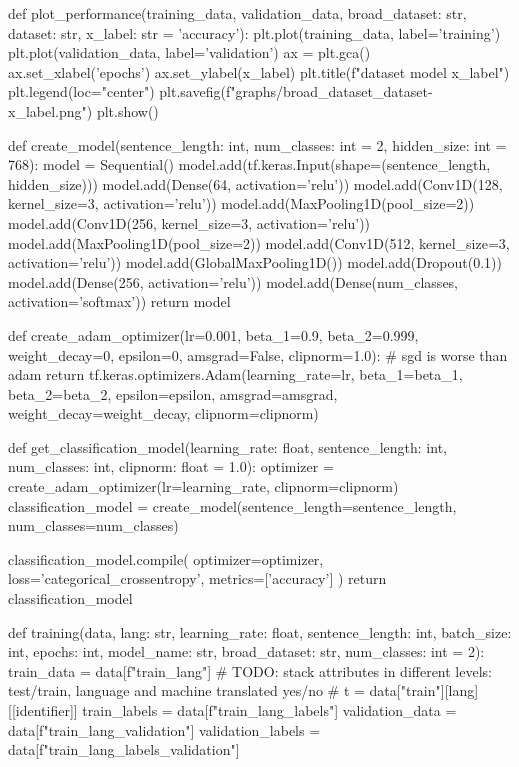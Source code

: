 \begin{python}
def plot_performance(training_data, validation_data, broad_dataset: str, dataset: str, x_label: str = 'accuracy'):
    plt.plot(training_data, label='training')
    plt.plot(validation_data, label='validation')
    ax = plt.gca()
    ax.set_xlabel('epochs')
    ax.set_ylabel(x_label)
    plt.title(f"{dataset} model {x_label}")
    plt.legend(loc="center")
    plt.savefig(f"graphs/{broad_dataset}_{dataset}-{x_label}.png")
    plt.show()


def create_model(sentence_length: int, num_classes: int = 2, hidden_size: int = 768):
    model = Sequential()
    model.add(tf.keras.Input(shape=(sentence_length, hidden_size)))
    model.add(Dense(64, activation='relu'))
    model.add(Conv1D(128, kernel_size=3, activation='relu'))
    model.add(MaxPooling1D(pool_size=2))
    model.add(Conv1D(256, kernel_size=3, activation='relu'))
    model.add(MaxPooling1D(pool_size=2))
    model.add(Conv1D(512, kernel_size=3, activation='relu'))
    model.add(GlobalMaxPooling1D())
    model.add(Dropout(0.1))
    model.add(Dense(256, activation='relu'))
    model.add(Dense(num_classes, activation='softmax'))
    return model


def create_adam_optimizer(lr=0.001, beta_1=0.9, beta_2=0.999, weight_decay=0, epsilon=0, amsgrad=False, clipnorm=1.0):
    # sgd is worse than adam
    return tf.keras.optimizers.Adam(learning_rate=lr, beta_1=beta_1, beta_2=beta_2, epsilon=epsilon, amsgrad=amsgrad,
                                    weight_decay=weight_decay, clipnorm=clipnorm)


def get_classification_model(learning_rate: float, sentence_length: int,  num_classes: int, clipnorm: float = 1.0):
    optimizer = create_adam_optimizer(lr=learning_rate, clipnorm=clipnorm)
    classification_model = create_model(sentence_length=sentence_length, num_classes=num_classes)

    classification_model.compile(
        optimizer=optimizer,
        loss='categorical_crossentropy',
        metrics=['accuracy']
    )
    return classification_model


def training(data, lang: str, learning_rate: float, sentence_length: int, batch_size: int, epochs: int,
             model_name: str, broad_dataset: str, num_classes: int = 2):
    train_data = data[f"train_{lang}"]
    # TODO: stack attributes in different levels: test/train, language and machine translated yes/no
    # t = data["train"][lang][[identifier]]
    train_labels = data[f"train_{lang}_labels"]
    validation_data = data[f"train_{lang}_validation"]
    validation_labels = data[f"train_{lang}_labels_validation"]


\end{python}
